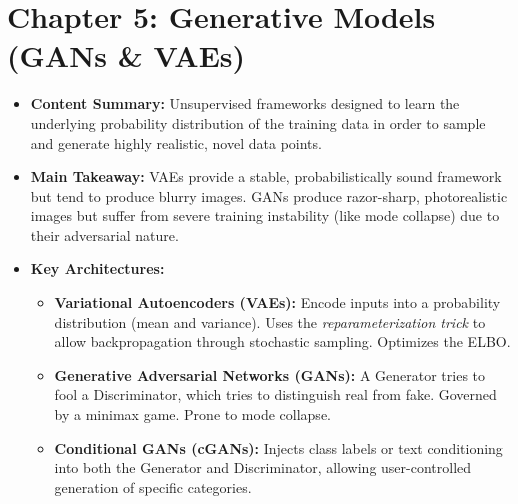 \section*{Chapter 5: Generative Models (GANs \& VAEs)}
\begin{itemize}
    \item \textbf{Content Summary:} Unsupervised frameworks designed to learn the underlying probability distribution of the training data in order to sample and generate highly realistic, novel data points.
    \item \textbf{Main Takeaway:} VAEs provide a stable, probabilistically sound framework but tend to produce blurry images. GANs produce razor-sharp, photorealistic images but suffer from severe training instability (like mode collapse) due to their adversarial nature.
    \item \textbf{Key Architectures:}
    \begin{itemize}
        \item \textbf{Variational Autoencoders (VAEs):} Encode inputs into a probability distribution (mean and variance). Uses the \textit{reparameterization trick} to allow backpropagation through stochastic sampling. Optimizes the ELBO.
        \item \textbf{Generative Adversarial Networks (GANs):} A Generator tries to fool a Discriminator, which tries to distinguish real from fake. Governed by a minimax game. Prone to mode collapse.
        \item \textbf{Conditional GANs (cGANs):} Injects class labels or text conditioning into both the Generator and Discriminator, allowing user-controlled generation of specific categories.
    \end{itemize}
\end{itemize}

